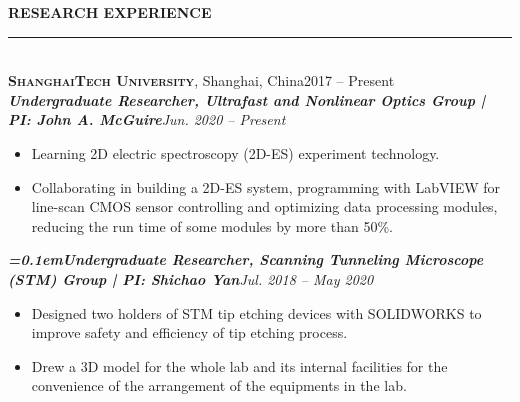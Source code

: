 \documentclass[letterpaper,11pt]{article}
\begin{document}
{\Large\bfseries{}RESEARCH EXPERIENCE}\\
\rule[1.5ex]{\columnwidth}{1pt}
\vspace{-4ex}\\
{\large\bfseries\scshape{}ShanghaiTech University}, Shanghai, China\hfill{2017 -- Present}\\
{\bfseries\itshape{}Undergraduate Researcher, Ultrafast and Nonlinear Optics Group | PI: John A. McGuire}\hfill{\itshape{}Jun. 2020 -- Present}\\
\vspace{-4ex}
\begin{itemize}
    \item Learning 2D electric spectroscopy (2D-ES) experiment technology.
    \item Collaborating in building a 2D-ES system, programming with LabVIEW for line-scan CMOS sensor controlling and optimizing data processing modules, reducing the run time of some modules by more than 50\%.
\end{itemize}
\vspace{-1ex}
{\bfseries\itshape{}\font=0.1em{}Undergraduate Researcher, Scanning Tunneling Microscope (STM) Group | PI: Shichao Yan}\hfill{\itshape{}Jul. 2018 -- May 2020}\\
\vspace{-4ex}
\begin{itemize}
    \item Designed two holders of STM tip etching devices with SOLIDWORKS to improve safety and efficiency of tip etching process.
    \item Drew a 3D model for the whole lab and its internal facilities for the convenience of the arrangement of the equipments in the lab.
\end{itemize}
\end{document}
